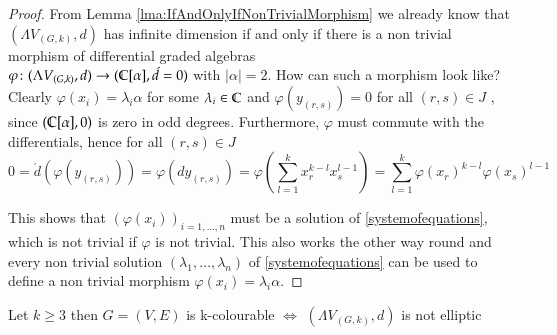 \begin{proof}
 From Lemma \ref{lma:IfAndOnlyIfNonTrivialMorphism} we already know that $(\Lambda V_{(G,k)},d)$  has infinite dimension if and only if %
 there is a non trivial morphism of differential graded algebras \\
 ${\varphi \colon (\Lambda V_{(G,k)},d) \to ( \mathbb{C} [\alpha] ,\acute{d} = 0)}$ with $|\alpha| = 2$. How can such a morphism look like?
 Clearly $\varphi(x_i) = \lambda_i \alpha$ for some $\lambda_i \in \mathbb{C}$ and $\varphi(y_{(r,s)}) = 0$ for all $(r,s) \in J$ , since 
 $(\mathbb{C} [\alpha] , 0)$ is zero in odd degrees. Furthermore, $\varphi$ must commute with the differentials, hence 
 for all $(r,s) \in J$
 $$ 0 = \acute{d} (\varphi(y_{(r,s)})) = \varphi(dy_{(r,s)}) = \varphi(\sum_{l = 1}^k x_r^{k -l} x_s^{l - 1})
 = \sum_{l = 1}^k \varphi(x_r)^{k -l} \varphi(x_s)^{l - 1}$$
 
 This shows that $(\varphi(x_i))_{i = 1, \dotsc , n}$ must be a solution of \ref{systemofequations}, which is not trivial
 if $\varphi$ is not trivial.
 This also works the other way round and every non trivial solution  $(\lambda_1 , \dotsc, \lambda_n)$ of \ref{systemofequations}
 can be used to define a non trivial morphism $\varphi(x_i) = \lambda_i \alpha$.
 \end{proof}

 \begin{Theorem}
  Let $k \geq 3$ then 
   $G = (V,E)$ is k-colourable $\iff$ $(\Lambda V_{(G,k)},d)$ is not elliptic
 \end{Theorem}

